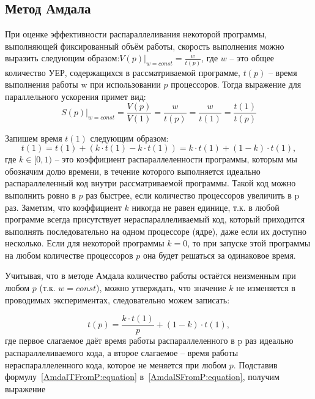\subsection{Метод Амдала}

При оценке эффективности распараллеливания некоторой программы, выполняющей фиксированный объём работы, скорость выполнения можно выразить следующим образом:$\left.V(p)\right|_{w = const} = \frac{w}{t(p)}$, где $w$ – это общее количество УЕР, содержащихся в рассматриваемой программе, $t(p)$ – время выполнения работы w при использовании $p$ процессоров. Тогда выражение для параллельного ускорения примет вид:
\begin{equation}
    \label{AmdalSFromP:equation}
    \left.S(p)\right|_{w = const} = \frac{V(p)}{V(1)} = \frac{w}{t(p)} = \frac{w}{t(1)} = \frac{t(1)}{t(p)}
\end{equation}

Запишем время $t(1)$ следующим образом:
\begin{equation}
    t(1) = t(1) + (k \cdot t(1) - k \cdot t(1)) = k \cdot t(1) + (1 - k) \cdot t(1),
\end{equation}
где $k \in [0,1)$ -- это коэффициент распараллеленности программы, которым мы обозначим долю времени, в течение которого выполняется идеально распараллеленный код внутри рассматриваемой программы. Такой код можно выполнить ровно в $p$ раз быстрее, если количество процессоров увеличить в p раз. Заметим, что коэффициент $k$ никогда не равен единице, т.к. в любой программе всегда присутствует нераспараллеливаемый код, который приходится выполнять последовательно на одном процессоре (ядре), даже если их доступно несколько. Если для некоторой программы $k=0$, то при запуске этой программы на любом количестве процессоров $p$ она будет решаться за одинаковое время.

Учитывая, что в методе Амдала количество работы остаётся неизменным при любом $p$ (т.к. $w=const$), можно утверждать, что значение $k$ не изменяется в проводимых экспериментах, следовательно можем записать:

\begin{equation}
    \label{AmdalTFromP:equation}
    t(p) = \frac{k \cdot t(1)}{p} + (1 - k) \cdot t(1),
\end{equation}
где первое слагаемое даёт время работы распараллеленного в p раз идеально распараллеливаемого кода, а второе слагаемое – время работы нераспараллеленного кода, которое не меняется при любом $p$. Подставив формулу~\eqref{AmdalTFromP:equation} в~\eqref{AmdalSFromP:equation}, получим выражение 

